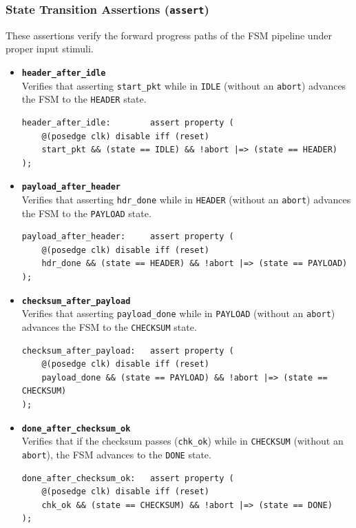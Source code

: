 \documentclass{article}
\begin{document}
\subsubsection{State Transition Assertions (\texttt{assert})}
These assertions verify the forward progress paths of the FSM pipeline under proper input stimuli.

\begin{itemize}
    \item \textbf{\texttt{header\_after\_idle}} \\
    Verifies that asserting \texttt{start\_pkt} while in \texttt{IDLE} (without an \texttt{abort}) advances the FSM to the \texttt{HEADER} state.
    \begin{verbatim}
header_after_idle:        assert property (
    @(posedge clk) disable iff (reset) 
    start_pkt && (state == IDLE) && !abort |=> (state == HEADER)
);
    \end{verbatim}
    
    \item \textbf{\texttt{payload\_after\_header}} \\
    Verifies that asserting \texttt{hdr\_done} while in \texttt{HEADER} (without an \texttt{abort}) advances the FSM to the \texttt{PAYLOAD} state.
    \begin{verbatim}
payload_after_header:     assert property (
    @(posedge clk) disable iff (reset) 
    hdr_done && (state == HEADER) && !abort |=> (state == PAYLOAD)
);
    \end{verbatim}
    
    \item \textbf{\texttt{checksum\_after\_payload}} \\
    Verifies that asserting \texttt{payload\_done} while in \texttt{PAYLOAD} (without an \texttt{abort}) advances the FSM to the \texttt{CHECKSUM} state.
    \begin{verbatim}
checksum_after_payload:   assert property (
    @(posedge clk) disable iff (reset) 
    payload_done && (state == PAYLOAD) && !abort |=> (state == CHECKSUM)
);
    \end{verbatim}
    
    \item \textbf{\texttt{done\_after\_checksum\_ok}} \\
    Verifies that if the checksum passes (\texttt{chk\_ok}) while in \texttt{CHECKSUM} (without an \texttt{abort}), the FSM advances to the \texttt{DONE} state.
    \begin{verbatim}
done_after_checksum_ok:   assert property (
    @(posedge clk) disable iff (reset) 
    chk_ok && (state == CHECKSUM) && !abort |=> (state == DONE)
);
    \end{verbatim}
    

\end{itemize}
\end{document}
